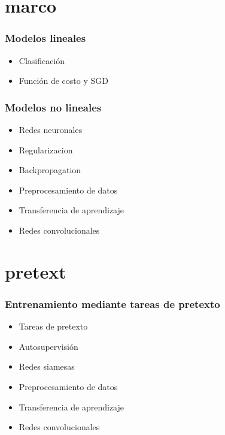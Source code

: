 \documentclass{beamer}
\begin{document}
\section{marco}
\begin{frame}
\frametitle{Modelos lineales}
\begin{itemize}
    \item Clasificación
    \item Función de costo y SGD 
\end{itemize}
\end{frame}




\begin{frame}
\frametitle{Modelos no lineales}
\begin{itemize}
    \item Redes neuronales
    \item Regularizacion
    \item Backpropagation
    \item Preprocesamiento de datos
    \item Transferencia de aprendizaje
    \item Redes convolucionales
\end{itemize}
\end{frame}





\section{pretext}
\begin{frame}
\frametitle{Entrenamiento mediante tareas de pretexto}
\begin{itemize}
    \item Tareas de pretexto 
    \item Autosupervisión 
    \item Redes siamesas 
    \item Preprocesamiento de datos
    \item Transferencia de aprendizaje
    \item Redes convolucionales
\end{itemize}
\end{frame}
\end{document}
